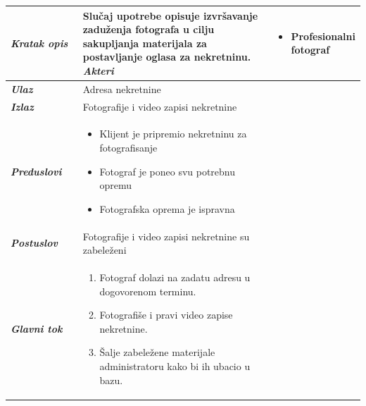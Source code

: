 \documentclass[20pt]{article}
\begin{document}
\begin{center}
\begin{longtable}{p{0.23\linewidth} p{0.77\linewidth}}
 \hline
 {\it \bfseries Kratak opis} & Slu\v{c}aj upotrebe opisuje izvr\v{s}avanje zadu\v{z}enja fotografa u cilju sakupljanja materijala za postavljanje oglasa za nekretninu.
\hline
 {\it \bfseries Akteri} & \begin{itemize}
    \item Profesionalni fotograf
    \end{itemize}\\
\hline

 {\it \bfseries Ulaz} & Adresa nekretnine\\   
 \hline
 
 {\it \bfseries Izlaz} & Fotografije i video zapisi nekretnine\\
 \hline
 
 {\it \bfseries Preduslovi} & \begin{itemize}
    \item Klijent je pripremio nekretninu za fotografisanje
    \item Fotograf je poneo svu potrebnu opremu
    \item Fotografska oprema je ispravna
    \end{itemize}\\
 \hline
 
 {\it \bfseries Postuslov} & Fotografije i video zapisi nekretnine su zabele\v{z}eni\\
 \hline


     {\it \bfseries Glavni tok} &  
     \begin{enumerate}
         \item  Fotograf dolazi na zadatu adresu u dogovorenom terminu. 
         \item  Fotografi\v{s}e i pravi video zapise nekretnine. 
         \item \v{S}alje zabele\v{z}ene materijale administratoru kako bi ih ubacio u bazu. 
    \end{enumerate}\\
 \hline


\end{longtable}
\end{center}
\end{document}
